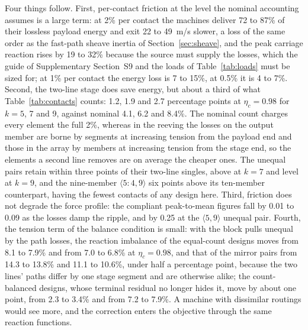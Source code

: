 \documentclass[preprint,12pt,number]{elsarticle}
\newcommand{\cfg}[2]{\langle #1,#2\rangle}
\newcommand{\ptm}{peak-to-mean}
\begin{document}
Four things follow. First, per-contact friction at the level the nominal accounting assumes is a large term: at 2\% per contact the machines deliver 72 to 87\% of their lossless payload energy and exit 22 to 49~m/s slower, a loss of the same order as the fast-path sheave inertia of Section~\ref{sec:sheave}, and the peak carriage reaction rises by 19 to 32\% because the source must supply the losses, which the guide of Supplementary Section~S9 and the loads of Table~\ref{tab:loads} must be sized for; at 1\% per contact the energy loss is 7 to 15\%, at 0.5\% it is 4 to 7\%. Second, the two-line stage does save energy, but about a third of what Table~\ref{tab:contacts} counts: 1.2, 1.9 and 2.7 percentage points at $\eta_c = 0.98$ for $k = 5$, 7 and 9, against nominal 4.1, 6.2 and 8.4\%. The nominal count charges every element the full 2\%, whereas in the reeving the losses on the output member are borne by segments at increasing tension from the payload end and those in the array by members at increasing tension from the stage end, so the elements a second line removes are on average the cheaper ones. The unequal pairs retain within three points of their two-line singles, above at $k=7$ and level at $k=9$, and the nine-member $\cfg{5{:}4}{9}$ six points above its ten-member counterpart, having the fewest contacts of any design here. Third, friction does not degrade the force profile: the compliant \ptm{} figures fall by 0.01 to 0.09 as the losses damp the ripple, and by 0.25 at the $\cfg{5}{9}$ unequal pair. Fourth, the tension term of the balance condition is small: with the block pulls unequal by the path losses, the reaction imbalance of the equal-count designs moves from 8.1 to 7.9\% and from 7.0 to 6.8\% at $\eta_c = 0.98$, and that of the mirror pairs from 14.3 to 13.8\% and 11.1 to 10.6\%, under half a percentage point, because the two lines' paths differ by one stage segment and are otherwise alike; the count-balanced designs, whose terminal residual no longer hides it, move by about one point, from 2.3 to 3.4\% and from 7.2 to 7.9\%. A machine with dissimilar routings would see more, and the correction enters the objective through the same reaction functions.
\end{document}
